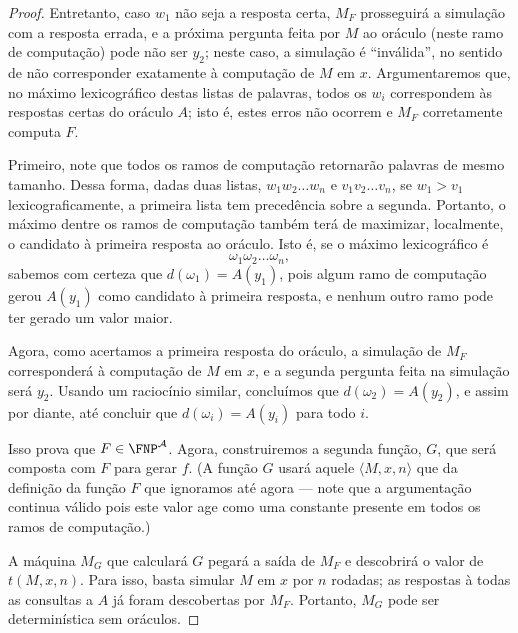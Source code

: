\begin{proof}
    Entretanto, caso $w_1$ não seja a resposta certa,
    $M_F$ prosseguirá a simulação com a resposta errada,
    e a próxima pergunta feita por $M$ ao oráculo
    (neste ramo de computação)
    pode não ser $y_2$;
    neste caso,
    a simulação é ``inválida'',
    no sentido de não corresponder exatamente à computação de $M$ em $x$.
    Argumentaremos que,
    no máximo lexicográfico destas listas de palavras,
    todos os $w_i$ correspondem às respostas certas do oráculo $A$;
    isto é, estes erros não ocorrem
    e $M_F$ corretamente computa $F$.

    Primeiro,
    note que todos os ramos de computação retornarão palavras de mesmo tamanho.
    Dessa forma,
    dadas duas listas, $w_1 w_2 \dots w_n$ e $v_1 v_2 \dots v_n$,
    se $w_1 > v_1$ lexicograficamente,
    a primeira lista tem precedência sobre a segunda.
    Portanto,
    o máximo dentre os ramos de computação
    também terá de maximizar, localmente,
    o candidato à primeira resposta ao oráculo.
    Isto é,
    se o máximo lexicográfico é
    \begin{equation*}
        \omega_1 \omega_2 \dots \omega_n,
    \end{equation*}
    sabemos com certeza que $d(\omega_1) = A(y_1)$,
    pois algum ramo de computação gerou $A(y_1)$ como candidato à primeira resposta,
    e nenhum outro ramo pode ter gerado um valor maior.

    Agora, como acertamos a primeira resposta do oráculo,
    a simulação de $M_F$ corresponderá à computação de $M$ em $x$,
    e a segunda pergunta feita na simulação será $y_2$.
    Usando um raciocínio similar,
    concluímos que $d(\omega_2) = A(y_2)$,
    e assim por diante,
    até concluir que $d(\omega_i) = A(y_i)$ para todo $i$.

    Isso prova que $F \in \FNP^\mathcal A$.
    Agora,
    construiremos a segunda função, $G$,
    que será composta com $F$ para gerar $f$.
    (A função $G$ usará aquele $\langle M, x, n \rangle$
    que da definição da função $F$ que ignoramos até agora
    --- note que a argumentação continua válido
    pois este valor age como uma constante presente em todos os ramos de computação.)

    A máquina $M_G$ que calculará $G$
    pegará a saída de $M_F$ e descobrirá o valor de $t(M, x, n)$.
    Para isso,
    basta simular $M$ em $x$ por $n$ rodadas;
    as respostas à todas as consultas a $A$ já foram descobertas por $M_F$.
    Portanto,
    $M_G$ pode ser determinística sem oráculos.


\end{proof}
